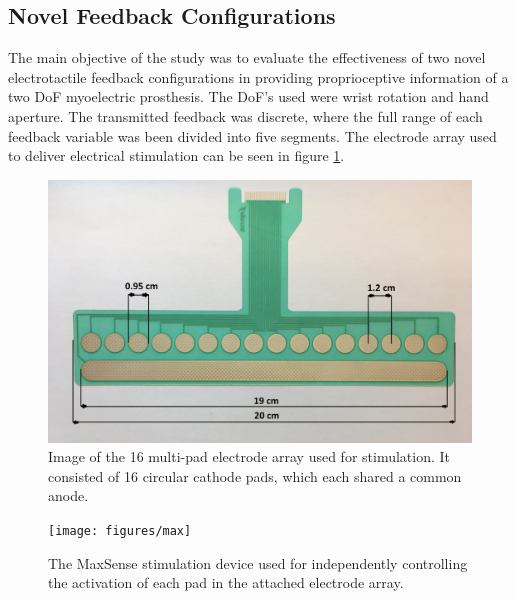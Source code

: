 \subsection{Novel Feedback Configurations}
The main objective of the study was to evaluate the effectiveness of two novel electrotactile feedback configurations in providing proprioceptive information of a two DoF myoelectric prosthesis. 
The DoF's used were wrist rotation and hand aperture. The transmitted feedback was discrete, where the full range of each feedback variable was been divided into five segments. The electrode array used to deliver electrical stimulation can be seen in figure \ref{fig:pa:electrode}.
\begin{figure}[H]                 
	\includegraphics[width=1\textwidth]{figures/electrode}  
	\caption{Image of the 16 multi-pad electrode array used for stimulation. It consisted of 16 circular cathode pads, which each shared a common anode.}
	\label{fig:pa:electrode} 
\end{figure}
\begin{figure}[h]                 
	\texttt{[image: figures/max]}  
	\caption{The MaxSense stimulation device used for independently controlling the activation of each pad in the attached electrode array.}
	\label{fig:pa:max} 
\end{figure}   

